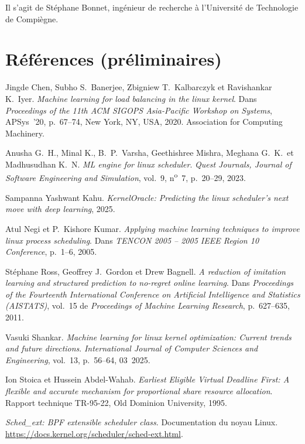 \documentclass[11pt,a4paper]{article}
\begin{document}
Il s’agit de Stéphane Bonnet, ingénieur de recherche à l’Université de Technologie de Compiègne.

\section{Références (préliminaires)}
\begin{enumerate}[leftmargin=2em,itemsep=4pt,label={[\arabic*]}]
  \item Jingde Chen, Subho S.\ Banerjee, Zbigniew T.\ Kalbarczyk et Ravishankar K.\ Iyer.
    \emph{Machine learning for load balancing in the linux kernel}. Dans
    \textit{Proceedings of the 11th ACM SIGOPS Asia-Pacific Workshop on Systems},
    APSys~'20, p.~67--74, New York, NY, USA, 2020. Association for Computing Machinery.
  \item Anusha G.~H., Minal K., B.~P.\ Varsha, Geethishree Mishra, Meghana G.~K.\ et
    Madhusudhan K.~N. \emph{ML engine for linux scheduler}. \textit{Quest Journals,
    Journal of Software Engineering and Simulation}, vol.~9, n\textsuperscript{o}~7,
    p.~20--29, 2023.
  \item Sampanna Yashwant Kahu. \emph{KernelOracle: Predicting the linux scheduler's
    next move with deep learning}, 2025.
  \item Atul Negi et P.\ Kishore Kumar. \emph{Applying machine learning techniques to
    improve linux process scheduling}. Dans \textit{TENCON 2005 -- 2005 IEEE Region 10
    Conference}, p.~1--6, 2005.
  \item Stéphane Ross, Geoffrey J.\ Gordon et Drew Bagnell. \emph{A reduction of
    imitation learning and structured prediction to no-regret online learning}. Dans
    \textit{Proceedings of the Fourteenth International Conference on Artificial
    Intelligence and Statistics (AISTATS)}, vol.~15 de \textit{Proceedings of Machine
    Learning Research}, p.~627--635, 2011.
  \item Vasuki Shankar. \emph{Machine learning for linux kernel optimization: Current
    trends and future directions}. \textit{International Journal of Computer Sciences
    and Engineering}, vol.~13, p.~56--64, 03~2025.
  \item Ion Stoica et Hussein Abdel-Wahab. \emph{Earliest Eligible Virtual Deadline
    First: A flexible and accurate mechanism for proportional share resource
    allocation}. Rapport technique TR-95-22, Old Dominion University, 1995.
  \item \emph{Sched\_ext: BPF extensible scheduler class}. Documentation du noyau
    Linux. \url{https://docs.kernel.org/scheduler/sched-ext.html}.
\end{enumerate}
\end{document}
